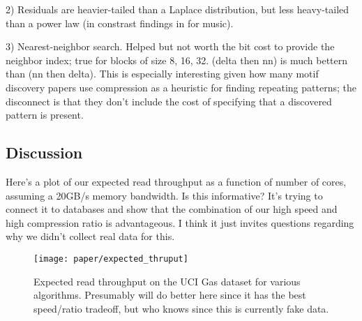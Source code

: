 2) Residuals are heavier-tailed than a Laplace distribution, but less heavy-tailed than a power law (in constrast findings in \cite{shorten} for music).

3) Nearest-neighbor search. Helped but not worth the bit cost to provide the neighbor index; true for blocks of size 8, 16, 32. (delta then nn) is much bettern than (nn then delta). This is especially interesting given how many motif discovery papers use compression as a heuristic for finding repeating patterns; the disconnect is that they don't include the cost of specifying that a discovered pattern is present.


\subsection{Discussion}

Here's a plot of our expected read throughput as a function of number of cores, assuming a 20GB/s memory bandwidth. Is this informative? It's trying to connect it to databases and show that the combination of our high speed and high compression ratio is advantageous. I think it just invites questions regarding why we didn't collect real data for this.

\begin{figure}[h]
\begin{center}
    \texttt{[image: paper/expected\_thruput]}
    \caption{Expected read throughput on the UCI Gas dataset for various algorithms. Presumably \minesp will do better here since it has the best speed/ratio tradeoff, but who knows since this is currently fake data.}
    \label{fig:expected_thruput}
\end{center}
\end{figure}
